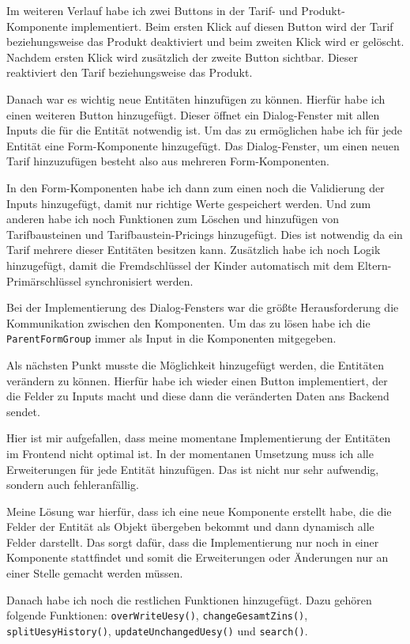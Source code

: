 Im weiteren Verlauf habe ich zwei Buttons in der Tarif- und Produkt-Komponente implementiert. Beim ersten Klick auf diesen Button wird der Tarif beziehungsweise das Produkt deaktiviert und beim zweiten Klick
wird er gelöscht. Nachdem ersten Klick wird zusätzlich der zweite Button sichtbar. Dieser reaktiviert den Tarif beziehungsweise das Produkt.

Danach war es wichtig neue Entitäten hinzufügen zu können. Hierfür habe ich einen weiteren Button hinzugefügt. Dieser öffnet ein Dialog-Fenster mit allen Inputs die für die Entität
notwendig ist. Um das zu ermöglichen habe ich für jede Entität eine Form-Komponente hinzugefügt. Das Dialog-Fenster, um einen neuen Tarif hinzuzufügen besteht also aus mehreren 
Form-Komponenten. 

In den Form-Komponenten habe ich dann zum einen noch die Validierung der Inputs hinzugefügt, damit nur richtige Werte gespeichert werden. Und zum anderen habe ich noch Funktionen zum
Löschen und hinzufügen von Tarifbausteinen und Tarifbaustein-Pricings hinzugefügt. Dies ist notwendig da ein Tarif mehrere dieser Entitäten besitzen kann. Zusätzlich habe ich noch Logik hinzugefügt,
damit die Fremdschlüssel der Kinder automatisch mit dem Eltern-Primärschlüssel synchronisiert werden.

Bei der Implementierung des Dialog-Fensters war die größte Herausforderung die Kommunikation zwischen den Komponenten. Um das zu lösen habe ich die \texttt{ParentFormGroup} immer als Input in die 
Komponenten mitgegeben.

Als nächsten Punkt musste die Möglichkeit hinzugefügt werden, die Entitäten verändern zu können. Hierfür habe ich wieder einen Button 
implementiert, der die Felder zu Inputs macht und diese dann die veränderten Daten ans Backend sendet. 

Hier ist mir aufgefallen, dass meine momentane Implementierung der Entitäten im Frontend nicht optimal ist. In der momentanen Umsetzung
muss ich alle Erweiterungen für jede Entität hinzufügen. Das ist nicht nur sehr aufwendig, sondern auch fehleranfällig.

Meine Lösung war hierfür, dass ich eine neue Komponente erstellt habe, die die Felder der Entität als Objekt übergeben bekommt und dann dynamisch
alle Felder darstellt. Das sorgt dafür, dass die Implementierung nur noch in einer Komponente stattfindet und somit die Erweiterungen oder Änderungen
nur an einer Stelle gemacht werden müssen.

Danach habe ich noch die restlichen Funktionen hinzugefügt. Dazu gehören folgende Funktionen: \texttt{overWriteUesy()}, \texttt{changeGesamtZins()}, \texttt{splitUesyHistory()},
\texttt{updateUnchangedUesy()} und \texttt{search()}. 

